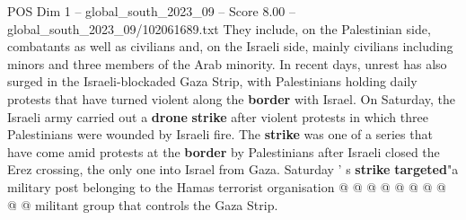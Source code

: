 \begin{textsample}{POS Dim 1 – global\_south\_2023\_09 – Score 8.00 – global\_south\_2023\_09/102061689.txt}
They include, on the Palestinian side, combatants as well as civilians and, on the Israeli side, mainly civilians including minors and three members of the Arab minority.
In recent days, unrest has also surged in the Israeli-blockaded Gaza Strip, with Palestinians holding daily protests that have turned violent along the \textbf{border} with Israel.
On Saturday, the Israeli army carried out a \textbf{drone} \textbf{strike} after violent protests in which three Palestinians were wounded by Israeli fire.
The \textbf{strike} was one of a series that have come amid protests at the \textbf{border} by Palestinians after Israeli closed the Erez crossing, the only one into Israel from Gaza.
Saturday ' s \textbf{strike} \textbf{targeted}"a military post belonging to the Hamas terrorist organisation @ @ @ @ @ @ @ @ @ @ militant group that controls the Gaza Strip.

\end{textsample}
